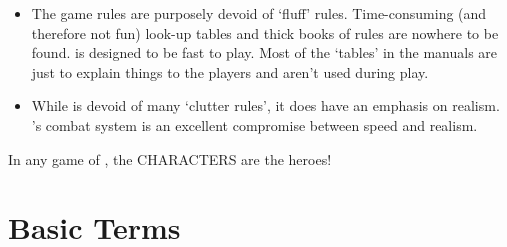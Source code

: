 \documentclass[twoside]{book}
\begin{document}
\begin{itemize}
            
  \item   
               
    {  
    The game rules are purposely devoid of
                `fluff' rules. Time-consuming (and therefore
                not fun) look-up tables and thick books of rules are
                nowhere to be found. \APATHY{}  is designed to be fast
                to play. Most of the `tables' in the \APATHY{}  manuals are just to explain things to the players and
                aren't used during play.
              
    }
    
            
  \item   
               
    {  
    While \APATHY{}  is devoid of many `clutter
                rules', it does have an emphasis on realism.
                \APATHY{}'s combat system is an excellent
                compromise between speed and realism.
              
    }
    
            
\end{itemize}
  
    {  
    In any game of \APATHY{}, the CHARACTERS are the
            heroes!
          
    }
  
    

\section{Basic Terms}
    
\end{document}
